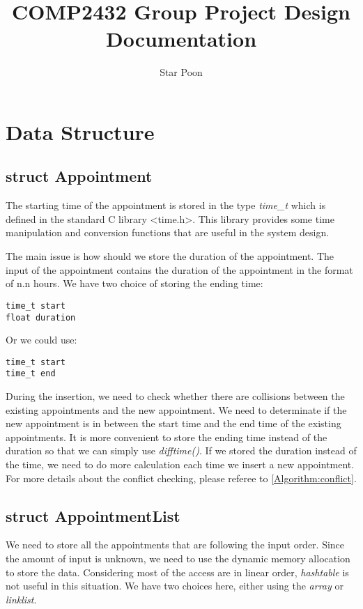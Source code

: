 \documentclass[10pt,a4paper]{article}
\author{Star Poon}
\title{COMP2432 Group Project Design Documentation}
\begin{document}
\maketitle
\section{Data Structure}
\subsection{struct Appointment}
The starting time of the appointment is stored in the type \textit{time\_t} which is defined in the standard C library \textless time.h\textgreater. This library provides some time manipulation and conversion functions that are useful in the system design.

The main issue is how should we store the duration of the appointment. The input of the appointment contains the duration of the appointment in the format of n.n hours. We have two choice of storing the ending time:
\begin{lstlisting}
time_t start
float duration
\end{lstlisting}
Or we could use:
\begin{lstlisting}
time_t start
time_t end
\end{lstlisting}

During the insertion, we need to check whether there are collisions between the existing appointments and the new appointment. We need to determinate if the new appointment is in between the start time and the end time of the existing appointments. It is more convenient to store the ending time instead of the duration so that we can simply use \textit{difftime()}. If we stored the duration instead of the time, we need to do more calculation each time we insert a new appointment. For more details about the conflict checking, please referee to \ref{Algorithm:conflict}.

\subsection{struct AppointmentList}
We need to store all the appointments that are following the input order. Since the amount of input is unknown, we need to use the dynamic memory allocation to store the data. Considering most of the access are in linear order, \textit{hashtable} is not useful in this situation. We have two choices here, either using the \textit{array} or \textit{linklist}.
\end{document}
